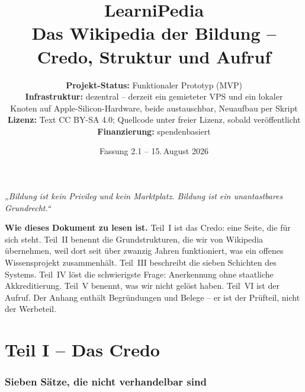 \documentclass[11pt,a4paper]{article}
\title{\textbf{\Huge LearniPedia} \\[0.4em] \Large Das Wikipedia der Bildung -- Credo, Struktur und Aufruf}
\author{\textbf{Projekt-Status:} Funktionaler Prototyp (MVP) \\
\textbf{Infrastruktur:} dezentral -- derzeit ein gemieteter VPS und ein lokaler \\
Knoten auf Apple-Silicon-Hardware, beide austauschbar, Neuaufbau per Skript \\
\textbf{Lizenz:} Text CC BY-SA 4.0; Quellcode unter freier Lizenz, sobald veröffentlicht \\
\textbf{Finanzierung:} spendenbasiert}
\date{Fassung 2.1 -- 15.\,August 2026}
\newcommand{\teilnummerierung}[1]{%
    \setcounter{section}{0}%
    \renewcommand{\thesection}{#1.\arabic{section}}%
    \renewcommand{\theHsection}{#1.\arabic{section}}%
}
\begin{document}
\maketitle

\nopagebreak
\begin{center}
    \textit{\large „Bildung ist kein Privileg und kein Marktplatz. Bildung ist ein unantastbares Grundrecht.“}
\end{center}
\vspace{1em}

\tableofcontents
\vspace{1em}

\noindent\textbf{Wie dieses Dokument zu lesen ist.} Teil~I ist das Credo: eine Seite, die für sich steht. Teil~II benennt die Grundstrukturen, die wir von Wikipedia übernehmen, weil dort seit über zwanzig Jahren funktioniert, was ein offenes Wissensprojekt zusammenhält. Teil~III beschreibt die sieben Schichten des Systems. Teil~IV löst die schwierigste Frage: Anerkennung ohne staatliche Akkreditierung. Teil~V benennt, was wir nicht gelöst haben. Teil~VI ist der Aufruf. Der Anhang enthält Begründungen und Belege -- er ist der Prüfteil, nicht der Werbeteil.

\part*{Teil I -- Das Credo}
\teilnummerierung{I}

\section{Sieben Sätze, die nicht verhandelbar sind}
\end{document}
